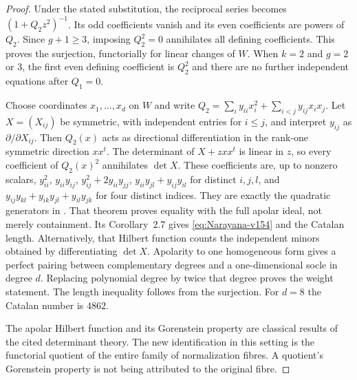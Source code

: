 \documentclass[11pt,reqno]{amsart}
\numberwithin{equation}{section}
\theoremstyle{definition}\newtheorem{definition}[theorem]{Definition}
\theoremstyle{remark}\newtheorem{remark}[theorem]{Remark}
\begin{document}
\begin{proof}
Under the stated substitution, the reciprocal series becomes
$(1+Q_2z^2)^{-1}$. Its odd coefficients vanish and its even
coefficients are powers of $Q_2$. Since $g+1\geq3$, imposing
$Q_2^2=0$ annihilates all defining coefficients. This proves the
surjection, functorially for linear changes of $W$. When $k=2$ and
$g=2$ or $3$, the first even defining coefficient is $Q_2^2$ and
there are no further independent equations after $Q_1=0$.

Choose coordinates $x_1,\ldots,x_d$ on $W$ and write
$Q_2=\sum_i y_{ii}x_i^2+\sum_{i<j}y_{ij}x_ix_j$.
Let $X=(X_{ij})$ be symmetric, with independent entries for $i\leq j$,
and interpret $y_{ij}$ as $\partial/\partial X_{ij}$. Then
$Q_2(x)$ acts as directional differentiation in the rank-one
symmetric direction $xx^t$. The determinant of $X+zxx^t$ is linear
in $z$, so every coefficient of $Q_2(x)^2$ annihilates $\det X$.
These coefficients are, up to nonzero scalars, $y_{ii}^2$,
$y_{ii}y_{ij}$, $y_{ij}^2+2y_{ii}y_{jj}$,
$y_{ii}y_{jl}+y_{ij}y_{il}$ for distinct $i,j,l$, and
$y_{ij}y_{kl}+y_{ik}y_{jl}+y_{il}y_{jk}$ for four distinct indices.
They are exactly the quadratic generators in
\cite[Proposition~3.1 and Theorem~3.10]{ShafieiSymmetric}.
That theorem proves equality with the full apolar ideal, not merely
containment. Its Corollary~2.7 gives \eqref{eq:Narayana-v154} and
the Catalan length. Alternatively, that Hilbert function counts the
independent minors obtained by differentiating $\det X$.
Apolarity to one homogeneous form gives a perfect pairing between
complementary degrees and a one-dimensional socle in degree $d$.
Replacing polynomial degree by twice that degree proves the weight
statement. The length inequality follows from the surjection.
For $d=8$ the Catalan number is $4862$.

The apolar Hilbert function and its Gorenstein property are classical
results of the cited determinant theory. The new identification in
this setting is the functorial quotient of the entire family of
normalization fibres. A quotient's Gorenstein property is not being
attributed to the original fibre.
\end{proof}
\end{document}
